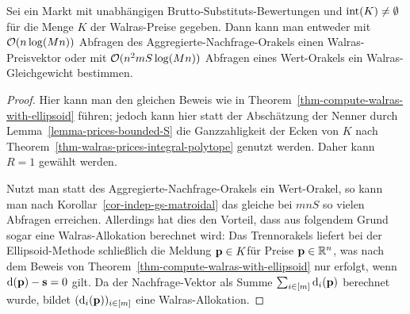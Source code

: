 \begin{theorem}
	Sei ein Markt mit unabhängigen Brutto-Substituts-Bewertungen und $\operatorname{int}(K)\neq \emptyset$ für die Menge $K$ der Walras-Preise gegeben.
	Dann kann man entweder mit $\mathcal{O}(n\log(Mn))$ Abfragen des Aggregierte-Nachfrage-Orakels einen Walras-Preisvektor oder mit $\mathcal{O}(n^2 m S\log(Mn))$ Abfragen eines Wert-Orakels ein Walras-Gleichgewicht bestimmen.
\end{theorem}
\begin{proof}
	Hier kann man den gleichen Beweis wie in Theorem~\ref{thm-compute-walras-with-ellipsoid} führen; jedoch kann hier statt der Abschätzung der Nenner durch Lemma~\ref{lemma-prices-bounded-S} die Ganzzahligkeit der Ecken von $K$ nach Theorem~\ref{thm-walras-prices-integral-polytope} genutzt werden.
	Daher kann $R=1$ gewählt werden.
	
	Nutzt man statt des Aggregierte-Nachfrage-Orakels ein Wert-Orakel, so kann man nach Korollar~\ref{cor-indep-gs-matroidal} das gleiche bei $mnS$ so vielen Abfragen erreichen.
	Allerdings hat dies den Vorteil, dass aus folgendem Grund sogar eine Walras-Allokation berechnet wird:
	Das Trennorakels liefert bei der Ellipsoid-Methode schließlich die Meldung \glqq$\mathbf{p}\in K$\grqq für Preise $\mathbf{p}\in\mathbb{R}^n$, was nach dem Beweis von Theorem~\ref{thm-compute-walras-with-ellipsoid} nur erfolgt, wenn $\operatorname{d}(\mathbf{p}) - \mathbf{s} = 0$ gilt.
	Da der Nachfrage-Vektor als Summe $\sum_{i\in\left[ m \right]} \operatorname{d}_i(\mathbf{p})$ berechnet wurde, bildet $(\operatorname{d}_i(\mathbf{p}))_{i\in\left[ m \right]}$ eine Walras-Allokation.
\end{proof}